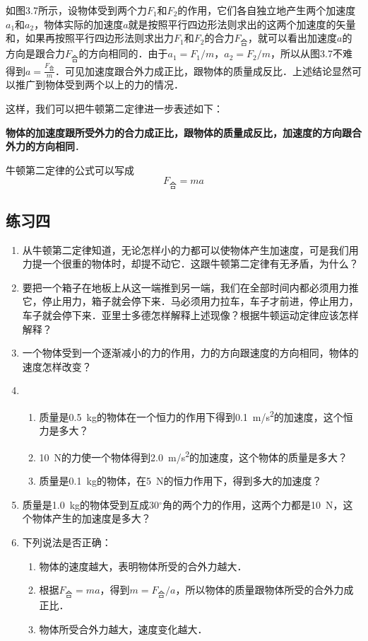 如图3.7所示，设物体受到两个力$F_1$和$F_2$的作用，它们各自独立地产生两个加速度$a_1$和$a_2$，物体实际的加速度$a$就是按照平行四边形法则求出的这两个加速度的矢量和，如果再按照平行四边形法则求出力$F_1$和$F_2$的合力$F_{\text{合}}$，就可以看出加速度$a$的方向是跟合力$F_{\text{合}}$的方向相同的．由于$a_1=F_1/m$，$a_2=F_2/m$，所以从图3.7不难得到$a=\frac{F_{\text{合}}}{m}$．可见加速度跟合外力成正比，跟物体的质量成反比．上述结论显然可以推广到物体受到两个以上的力的情况．

这样，我们可以把牛顿第二定律进一步表述如下：

\textbf{ 物体的加速度跟所受外力的合力成正比，跟物体的质量成反比，加速度的方向跟合外力的方向相同}．

牛顿第二定律的公式可以写成
\begin{equation}
    F_{\text{合}}=ma
\end{equation}

\subsection*{练习四}
\begin{enumerate}
    \item 从牛顿第二定律知道，无论怎样小的力都可以使物体产生加速度，可是我们用力提一个很重的物体时，却提不动它．这跟牛顿第二定律有无矛盾，为什么？
    \item 要把一个箱子在地板上从这一端推到另一端，我们在全部时间内都必须用力推它，停止用力，箱子就会停下来．马必须用力拉车，车子才前进，停止用力，车子就会停下来．亚里士多德怎样解释上述现像？根据牛顿运动定律应该怎样解释？
    \item 一个物体受到一个逐渐减小的力的作用，力的方向跟速度的方向相同，物体的速度怎样改变？
    \item \begin{enumerate}
              \item  质量是\SI{0.5}{kg}的物体在一个恒力的作用下得到\SI{0.1}{m/s^2}的加速度，这个恒力是多大？
              \item \SI{10}{N}的力使一个物体得到\SI{2.0}{m/s^2}的加速度，这个物体的质量是多大？
              \item 质量是\SI{0.1}{kg}的物体，在\SI{5}{N}的恒力作用下，得到多大的加速度？
          \end{enumerate}
    \item 质量是\SI{1.0}{kg}的物体受到互成30$^\circ$角的两个力的作用，这两个力都是\SI{10}{N}，这个物体产生的加速度是多大？
    \item 下列说法是否正确：
          \begin{enumerate}
              \item 物体的速度越大，表明物体所受的合外力越大．
              \item 根据$F_{\text{合}}=ma$，得到$m=F_{\text{合}}/a$，所以物体的质量跟物体所受的合外力成正比．
              \item 物体所受合外力越大，速度变化越大．
          \end{enumerate}
\end{enumerate}
\newpage
